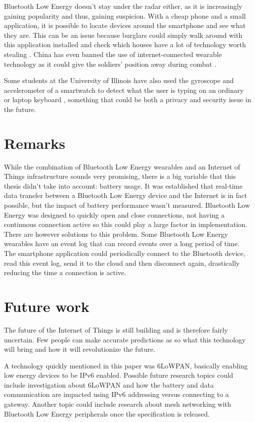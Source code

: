 \documentclass[pdftex,a4paper,12pt,twoside]{report}
\begin{document}
Bluetooth Low Energy doesn't stay under the radar either, as it is increasingly gaining popularity and thus, gaining suspicion. With a cheap phone and a small application, it is possible to locate devices around the smartphone and see what they are. This can be an issue because burglars could simply walk around with this application installed and check which houses have a lot of technology worth stealing \citep{ashford2015}. China has even banned the use of internet-connected wearable technology as it could give the soldiers' position away during combat \citep{bbcnews2015}.

Some students at the University of Illinois have also used the gyroscope and accelerometer of a smartwatch to detect what the user is typing on an ordinary or laptop keyboard \citep{wang2015mole}, something that could be both a privacy and security issue in the future.

\section{Remarks}
\label{sec:remarks}
While the combination of Bluetooth Low Energy wearables and an Internet of Things infrastructure sounds very promising, there is a big variable that this thesis didn't take into account: battery usage. It was established that real-time data transfer between a Bluetooth Low Energy device and the Internet is in fact possible, but the impact of battery performance wasn't measured. Bluetooth Low Energy was designed to quickly open and close connections, not having a continuous connection active so this could play a large factor in implementation. There are however solutions to this problem. Some Bluetooth Low Energy wearables have an event log that can record events over a long period of time. The smartphone application could periodically connect to the Bluetooth device, read this event log, send it to the cloud and then disconnect again, drastically reducing the time a connection is active.

\section{Future work}
\label{sec:futurework}
The future of the Internet of Things is still building and is therefore fairly uncertain. Few people can make accurate predictions as so what this technology will bring and how it will revolutionize the future.

A technology quickly mentioned in this paper was 6LoWPAN, basically enabling low energy devices to be IPv6 enabled. Possible future research topics could include investigation about 6LoWPAN and how the battery and data communication are impacted using IPv6 addressing versus connecting to a gateway. Another topic could include research about mesh networking with Bluetooth Low Energy peripherals once the specification is released.
\end{document}
